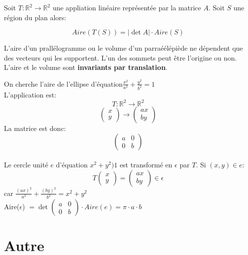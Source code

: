 \begin{theorem}
    Soit $T : \mathbb{R}^2 \to \mathbb{R}^2$  une appliation linéaire représentée par la matrice $A$. Soit $S$ une région du plan alors:
\begin{formule}
    \[Aire(T(S)) = |\det A| \cdot Aire(S)\]
\end{formule}
\end{theorem}
\begin{framedremark}
    L'aire d'un prallélogramme ou le volume d'un parraéélépiède ne dépendent que des vecteurs qui les supportent. L'un des sommets peut être l'origine ou non. L'aire et le volume sont \textbf{invariants par translation}.
\end{framedremark}
\begin{exemple}
    On cherche l'aire de l'ellipse d'équation$\frac{x^2}{a^2} + \frac{y^2}{b^2} = 1$
    \\
    L'application est:
    \[T: \mathbb{R}^2 \to \mathbb{R}^2 \]
    \[\begin{pmatrix}
        x \\ y
    \end{pmatrix} \to \begin{pmatrix}
        ax \\ by
    \end{pmatrix}\]
    La matrice est donc: 
    \[\begin{pmatrix}
        a & 0\\ 0 & b
    \end{pmatrix}\]
    \\
    Le cercle unité $e$ d'équation $x^2 + y^2 ) 1$ est transformé en $\epsilon$ par $T$. Si $(x, y) \in e$:
    \[T\begin{pmatrix}
        x \\ y
    \end{pmatrix} = \begin{pmatrix}
        ax \\ by
    \end{pmatrix} \in \epsilon\] car $\frac{(ax)^2}{a^2} + \frac{(by)^2}{b^2} = x^2 + y^2$
    \\
    Aire($\epsilon$) $= \det \begin{pmatrix}
        a & 0 \\ 0 & b
    \end{pmatrix} \cdot Aire(e) = \pi\cdot a \cdot b$
\end{exemple}


\chapter{Autre}

